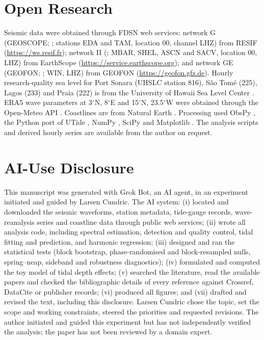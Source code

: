 \documentclass[11pt]{article}
\newcommand{\degr}{\ensuremath{^\circ}}
\begin{document}
\section*{Open Research}
Seismic data were obtained through FDSN web services: network G (GEOSCOPE; \citealp{geoscope}; stations EDA and TAM, location 00, channel LHZ) from RESIF (\url{https://ws.resif.fr}); network II (\citealp{gsnII}; MBAR, SHEL, ASCN and SACV, location 00, LHZ) from EarthScope (\url{https://service.earthscope.org}); and network GE (GEOFON; \citealp{geofon}; WIN, LHZ) from GEOFON (\url{https://geofon.gfz.de}). Hourly research-quality sea level for Port Sonara (UHSLC station 816), S\~ao Tom\'e (225), Lagos (233) and Praia (222) is from the University of Hawaii Sea Level Center \citep{uhslc}. ERA5 wave parameters \citep{hersbach2020} at 3\degr N, 8\degr E and 15\degr N, 23.5\degr W were obtained through the Open-Meteo API \citep{zippenfenig2024}. Coastlines are from Natural Earth \citep{naturalearth}. Processing used ObsPy \citep{beyreuther2010}, the Python port of UTide \citep{utidepy,codiga2011}, NumPy \citep{harris2020}, SciPy \citep{virtanen2020} and Matplotlib \citep{hunter2007}. The analysis scripts and derived hourly series are available from the author on request.

\section*{AI-Use Disclosure}
This manuscript was generated with Grok Bot, an AI agent, in an experiment initiated and guided by Larsen Cundric. The AI system: (i) located and downloaded the seismic waveforms, station metadata, tide-gauge records, wave-reanalysis series and coastline data through public web services; (ii) wrote all analysis code, including spectral estimation, detection and quality control, tidal fitting and prediction, and harmonic regression; (iii) designed and ran the statistical tests (block bootstrap, phase-randomised and block-resampled nulls, spring--neap, sideband and robustness diagnostics); (iv) formulated and computed the toy model of tidal depth effects; (v) searched the literature, read the available papers and checked the bibliographic details of every reference against Crossref, DataCite or publisher records; (vi) produced all figures; and (vii) drafted and revised the text, including this disclosure. Larsen Cundric chose the topic, set the scope and working constraints, steered the priorities and requested revisions. The author initiated and guided this experiment but has not independently verified the analysis; the paper has not been reviewed by a domain expert.
\end{document}
